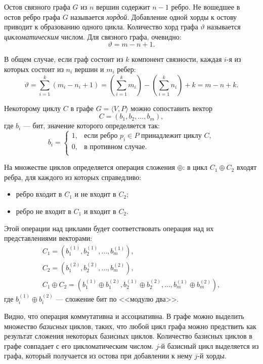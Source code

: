 Остов связного графа $G$ из $n$ вершин содержит $n-1$ ребро. Не вошедшее в остов ребро графа $G$ называется \emph{хордой}. Добавление одной хорды к остову приводит к образованию одного цикла. Количество хорд графа $\vartheta$ называется \emph{цикломатическим} числом. Для связного графа, очевидно:
\[\vartheta=m-n+1.\]

В общем случае, если граф состоит из $k$ компонент связности, каждая $i$-я из которых состоит из $n_i$ вершин и $m_i$ ребер:
\[\vartheta=\sum_{i=1}^{k}(m_i-n_i+1)=\left(\sum_{i=1}^{k}m_i\right)-\left(\sum_{i=1}^{k}n_i\right)+k=m-n+k.\]

Некоторому циклу $C$ в графе $G=\langle V,P\rangle$ можно сопоставить вектор 
\[C=(b_1,b_2,\ldots,b_m),\]
где $b_i$ --- бит, значение которого определяется так:
\[
    b_i=
    \begin{cases}
        1,&\text{если ребро $p_i\in P$ принадлежит циклу $C$},\\
        0,&\text{в противном случае}.\\
    \end{cases}
\]

На множестве циклов определяется операция сложения $\oplus$: в цикл $C_1\oplus C_2$ входят ребра, для каждого из которых справедливо:
\begin{itemize}
    \item ребро входит в $C_1$ и не входит в $C_2$;
    \item ребро не входит в $C_1$ и входит в $C_2$.
\end{itemize}

Этой операции над циклами будет соответствовать операция над их представлениями векторами:
\[
    \begin{split}
        C_1=(b_1^{(1)},b_2^{(1)},\ldots,b_m^{(1)}),\\
        C_2=(b_1^{(2)},b_2^{(2)},\ldots,b_m^{(2)}),\\
        C_1\oplus C_2=(b_1^{(1)}\oplus b_1^{(2)},b_2^{(1)}\oplus b_2^{(2)},\ldots,b_m^{(1)}\oplus b_m^{(2)}),
    \end{split}
\]
где $b_i^{(1)}\oplus b_i^{(2)}$ --- сложение бит по <<модулю два>>.

Видно, что операция коммутативна и ассоциативна. В графе можно выделить множество \emph{базисных} циклов, таких, что любой цикл графа можно предствить как результат сложения некоторых базисных циклов. Количество базисных циклов в графе совпадает с его цикломатическим числом. $j$-й базисный цикл выделяется из графа, который получается из остова при добавлении к нему $j$-й хорды.

